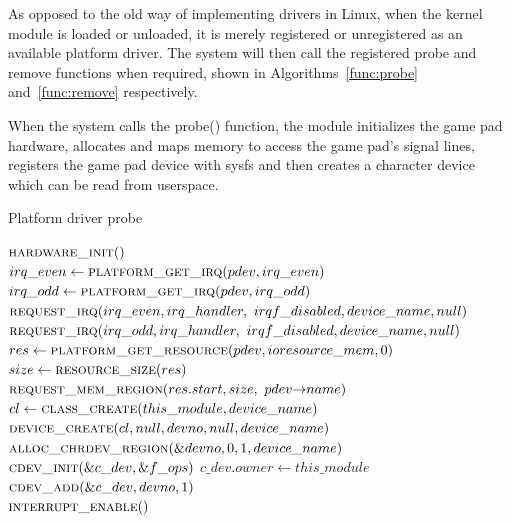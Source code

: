 
As opposed to the old way of implementing drivers in Linux, when the kernel
module is loaded or unloaded, it is merely registered or unregistered as an
available platform driver. The system will then call the registered probe and
remove functions when required, shown in Algorithms~\ref{func:probe}
and~\ref{func:remove} respectively.

When the system calls the probe() function, the module initializes the game pad
hardware, allocates and maps memory to access the game pad's signal lines,
registers the game pad device with sysfs and then creates a character device
which can be read from userspace.

\begin{algorithm}
  \footnotesize
  \caption{Platform driver probe}
  \begin{algorithmic}[1]
      \State $\Call{hardware\_init}{\null}$ \\

      \State $irq\_even \gets \Call{platform\_get\_irq}{pdev, irq\_even}$
      \State $irq\_odd \gets \Call{platform\_get\_irq}{pdev, irq\_odd}$
      \State $\Call{request\_irq}{irq\_even, irq\_handler, \
        irqf\_disabled, device\_name, null}$
      \State $\Call{request\_irq}{irq\_odd, irq\_handler, \
        irqf\_disabled, device\_name, null}$ \\

      \State $res \gets \Call{platform\_get\_resource}{pdev,
        ioresource\_mem, 0}$
      \State $size \gets \Call{resource\_size}{res}$
      \State $\Call{request\_mem\_region}{res.start,  size, \
        pdev{\rightarrow}name}$ \\

      \State $cl \gets \Call{class\_create}{this\_module, device\_name}$
      \State $\Call{device\_create}{cl, null, devno, null, device\_name}$ \\

      \State $\Call{alloc\_chrdev\_region}{\&devno, 0, 1, device\_name}$ \\
      \State $\Call{cdev\_init}{\&c\_dev, \&f\_ops}$
      \State $c\_dev.owner \gets this\_module$
      \State $\Call{cdev\_add}{\&c\_dev, devno, 1}$ \\

      \State $\Call{interrupt\_enable}{\null}$
    \EndFunction
  \end{algorithmic}
  \label{func:probe}
\end{algorithm}

